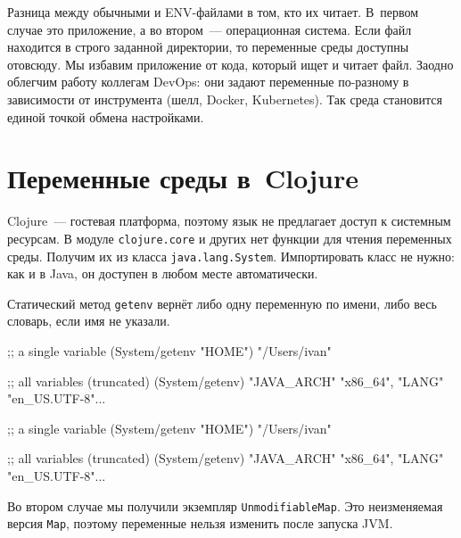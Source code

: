 
Разница между обычными и ENV-файлами в том, кто их читает. В~первом случае это
приложение, а во втором~--- операционная система. Если файл находится в строго
заданной директории, то переменные среды доступны отовсюду. Мы избавим
приложение от кода, который ищет и читает файл. Заодно облегчим работу коллегам
DevOps: они задают переменные по-разному в зависимости от инструмента (шелл,
Docker, Kubernetes). Так среда становится единой точкой обмена настройками.

\section{Переменные среды в~Clojure}


Clojure~--- гостевая платформа, поэтому язык не предлагает доступ к системным
ресурсам. В модуле \verb|clojure.core| и других нет функции для чтения
переменных среды. Получим их из класса \verb|java.lang.System|. Импортировать
класс не нужно: как и в Java, он доступен в любом месте автоматически.

Статический метод \verb|getenv| вернёт либо одну переменную по имени, либо
весь словарь, если имя не указали.

\ifnarrow

\begin{english}
  \begin{clojure}
;; a single variable
(System/getenv "HOME")
"/Users/ivan"

;; all variables (truncated)
(System/getenv)
{"JAVA_ARCH" "x86_64",
 "LANG" "en_US.UTF-8"...}
  \end{clojure}
\end{english}

\else

\begin{english}
  \begin{clojure}
;; a single variable
(System/getenv "HOME")
"/Users/ivan"

;; all variables (truncated)
(System/getenv)
{"JAVA_ARCH" "x86_64", "LANG" "en_US.UTF-8"...}
  \end{clojure}
\end{english}

\fi

Во втором случае мы получили экземпляр \texttt{UnmodifiableMap}. Это
неизменяемая версия \verb|Map|, поэтому переменные нельзя изменить после запуска
JVM.

